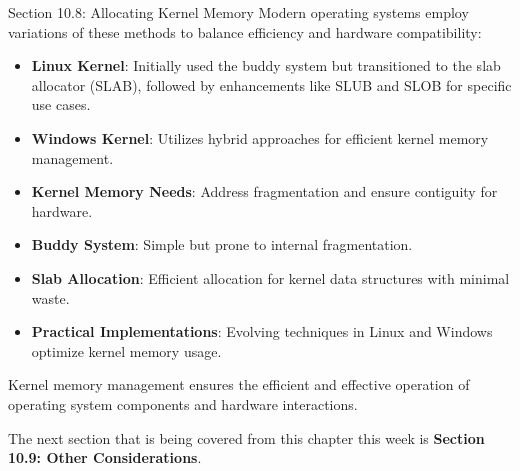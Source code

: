 \begin{notes}{Section 10.8: Allocating Kernel Memory}
    Modern operating systems employ variations of these methods to balance efficiency and hardware compatibility:
    
    \begin{highlight}
    
    \begin{itemize}
        \item \textbf{Linux Kernel}: Initially used the buddy system but transitioned to the slab allocator (SLAB), followed by enhancements like SLUB and SLOB for specific use cases.
        \item \textbf{Windows Kernel}: Utilizes hybrid approaches for efficient kernel memory management.
    \end{itemize}
    
    \end{highlight}
    
    \begin{highlight}
    
    \begin{itemize}
        \item \textbf{Kernel Memory Needs}: Address fragmentation and ensure contiguity for hardware.
        \item \textbf{Buddy System}: Simple but prone to internal fragmentation.
        \item \textbf{Slab Allocation}: Efficient allocation for kernel data structures with minimal waste.
        \item \textbf{Practical Implementations}: Evolving techniques in Linux and Windows optimize kernel memory usage.
    \end{itemize}
    
    Kernel memory management ensures the efficient and effective operation of operating system components and hardware interactions.
    \end{highlight}
\end{notes}

The next section that is being covered from this chapter this week is \textbf{Section 10.9: Other Considerations}.

